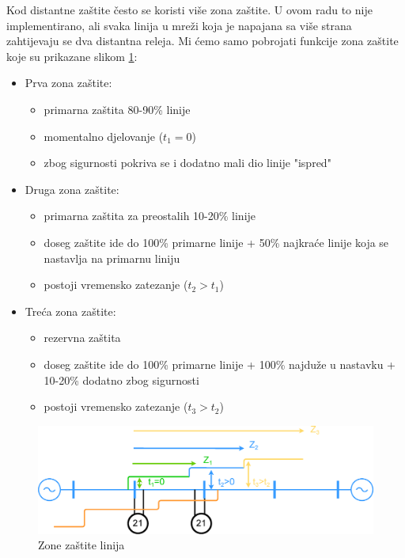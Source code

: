 Kod distantne zaštite često se koristi više zona zaštite. U ovom radu to nije implementirano, ali svaka linija u mreži koja je napajana sa više strana zahtijevaju se dva distantna releja. Mi ćemo samo pobrojati funkcije zona zaštite koje su prikazane slikom \ref{fig:shema5}:
\begin{itemize}
    \item Prva zona zaštite: \begin{itemize}
        \item primarna zaštita 80-90\% linije
        \item momentalno djelovanje ($t_1=0$)
        \item zbog sigurnosti pokriva se i dodatno mali dio linije "ispred"
    \end{itemize}
    \item Druga zona zaštite: \begin{itemize}
        \item primarna zaštita za preostalih 10-20\% linije
        \item doseg zaštite ide do 100\% primarne linije + 50\% najkraće linije koja se nastavlja na primarnu liniju
        \item postoji vremensko zatezanje ($t_2>t_1$)
    \end{itemize}
    \item Treća zona zaštite: \begin{itemize}
        \item rezervna zaštita
        \item doseg zaštite ide do 100\% primarne linije + 100\% najduže u nastavku + 10-20\% dodatno zbog sigurnosti
        \item postoji vremensko zatezanje ($t_3>t_2$)
    \end{itemize}
\end{itemize}

\begin{figure}[H]
  \centering
  \includegraphics[width=1\textwidth]{shema5}
  \caption{Zone zaštite linija}
  \label{fig:shema5}
\end{figure}

